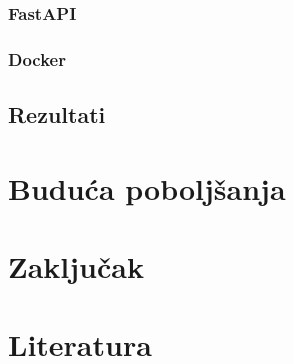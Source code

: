 \documentclass[a4paper,12pt,titlepage]{article}
\begin{document}
	\subsubsection{FastAPI}
	\subsubsection{Docker}
	\subsection{Rezultati}
	
	\section{Buduća poboljšanja}
	\newpage
	
	\section{Zaključak}
	\newpage
	
	\section*{Literatura}
	\newpage
\end{document}
